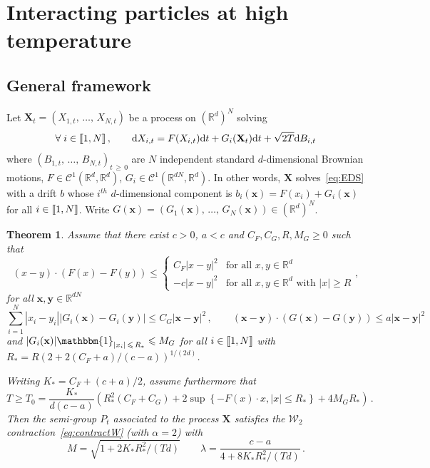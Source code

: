 \documentclass[10pt]{amsart}
\newtheorem{theo}{Theorem}[section]
\theoremstyle{definition}\newtheorem{defi}[theo]{Definition}\newtheorem{rema}[theo]{Remark}\newtheorem{exam}[theo]{Example}\newtheorem{exem}[theo]{Example}\newtheorem{nota}[theo]{Notation}
\newcommand{\llbracket}{\mathopen{[\mkern -2.7mu[}}
\newcommand{\rrbracket}{\mathclose{]\mkern -2.7mu]}}
\newcommand{\R}{\mathbb R}
\newcommand{\clC}{\mathcal C}
\newcommand{\clW}{\mathcal W}
\newcommand{\dd}{\mathrm{d}}
\newcommand{\1}{\mathbbm{1}}
\newcommand{\bx}{\mathbf{x}}
\newcommand{\by}{\mathbf{y}}
\newcommand{\bX}{\mathbf{X}}
\let\oldforall\forall
\renewcommand*{\forall}{\mathrel{\oldforall}}
\providecommand{\llbracket}{\mathopen{[\mkern-2.7mu[}}\providecommand{\rrbracket}{\mathclose{]\mkern-2.7mu]}}
\begin{document}
\section{Interacting particles at high temperature}\label{sec:particules}

\subsection{General framework} Let $\bX_t = (X_{1,t},\,\dots,\,X_{N,t})$ be a process on $(\R^d)^N$ solving
\[
\forall i\in\llbracket 1,N\rrbracket\,,\qquad \dd X_{i,t} = F(X_{i,t}) \dd t + G_i(\bX_t) \dd t + \sqrt{2T}\dd B_{i,t}
\]
where $(B_{1,t},\,\dots,\,B_{N,t})_{t\,\geqslant\,0}$ are $N$ independent standard $d$-dimensional Brownian motions, $F\in\clC^1(\R^d,\R^d)$, $G_i\in \clC^1(\R^{dN},\R^{d})$. In other words, $\bX$ solves~\eqref{eq:EDS} with a drift $b$ whose $i^{th}$ $d$-dimensional component is $b_i(\bx)= F(x_i)+G_i(\bx)$ for all $i\in\llbracket 1,N\rrbracket$. Write $G(\bx)=(G_1(\bx),\,\dots,\,G_N(\bx))\in (\R^d)^{N}$.


\begin{theo}\label{thm:particules}
Assume that there exist $c>0$, $a<c$ and $C_F,C_G,R,M_G\geqslant 0$ such that
\begin{equation}\label{eq:F}
(x-y)\cdot (F(x)-F(y)) \leqslant \left\{
\begin{array}{ll}
C_F|x-y|^2 & \text{for all } x,y\in\R^d\\
-c|x-y|^2 & \text{for all } x,y\in\R^d \text{ with } |x|\geqslant R
\end{array}\right.,
\end{equation}
 for all $\bx,\by\in \R^{dN}$
\begin{equation}\label{eq:revision}
\sum_{i=1}^N |x_i-y_i||G_i(\bx) - G_i(\by)| \leqslant C_G |\bx-\by|^2 \,,\qquad (\bx-\by)\cdot (G(\bx)-G(\by)) \leqslant a|\bx-\by|^2
\end{equation}
and $|G_i(\bx)|\1_{|x_i|\,\leqslant\,R_*}\leqslant M_G$ for all $i\in\llbracket 1,N\rrbracket$ with $R_* = R\left( 2+2(C_F+a)/(c-a)\right)^{1/(2d)}$.

Writing $K_* = C_F+(c+a)/2$, assume furthermore that
\[
T \geqslant T_0 = \frac{K_*}{d(c-a)} \left( R_*^2\left(C_F+C_G\right) + 2 \sup\left\{-F(x)\cdot x, |x|\leqslant R_*\right\} +4 M_GR_* \right) \,.
\]
Then the semi-group $P_t$ associated to the process $\bX$ satisfies the $\clW_2$ contraction~\eqref{eq:contractW} (with $\alpha=2$) with
\[
M= \sqrt{1+2K_* R_*^2/(Td)}\qquad \lambda = \frac{c-a}{4+8K_* R_*^2/(Td)}\,.
\]
\end{theo}
\end{document}
